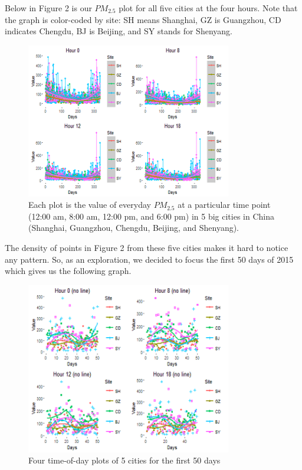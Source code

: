 \documentclass[11pt]{article} %
\begin{document}
	Below in Figure 2 is our  \(PM_{2.5}\) plot for all five cities at the four hours. Note that the graph is color-coded by site: SH means Shanghai, GZ is Guangzhou, CD indicates Chengdu, BJ is Beijing, and SY stands for Shenyang. 
	
\begin{figure}[!ht]
  \centering
    \includegraphics[width=0.8\textwidth]{Figure1-1}
      \caption{Each plot is the value of everyday \(PM_{2.5}\) at a particular time point (12:00 am, 8:00 am, 12:00 pm, and 6:00 pm) in 5 big cities in China (Shanghai, Guangzhou, Chengdu, Beijing, and Shenyang).
}
\end{figure}

	The density of points in Figure 2 from these five cities makes it hard to notice any pattern. So, as an exploration, we decided to focus the first 50 days of 2015 which gives us the following graph.
	
\begin{figure}[!ht]
  \centering
    \includegraphics[width=0.8\textwidth]{Figure1-2}
      \caption{Four time-of-day plots of 5 cities for the first 50 days}
\end{figure}
\end{document}
